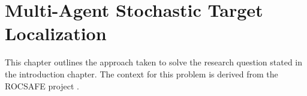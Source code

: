 
\chapter{Multi-Agent Stochastic Target Localization}\label{chap:targetLocalisation}
\workinprogress
This chapter outlines the approach taken to solve the research question stated in the introduction chapter. The context for this problem is derived from the ROCSAFE project \cite{rocsafeNUIG}. 












